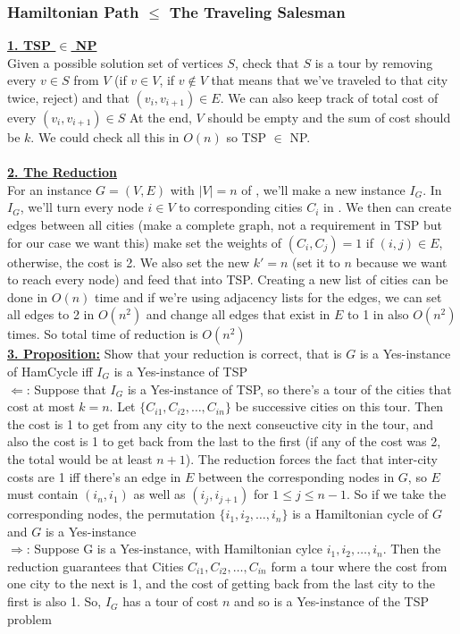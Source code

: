\subsubsection*{Hamiltonian Path $\leq$ The Traveling Salesman}
\ul{\textbf{1. TSP $\in$ NP}}\\
Given a possible solution set of vertices $S$, check that $S$ is a tour by removing every $v \in S$ from $V$ (if $v \in V$, if $v \not \in V$ that means that we've traveled to that city twice, reject) and that $(v_i, v_{i+1}) \in E$. We can also keep track of total cost of every $(v_i, v_{i+1}) \in S$ At the end, $V$ should be empty and the sum of cost should be $k$. We could check \medskip all this in $O(n)$ so TSP $\in$ NP. \\
\\
\ul{\textbf{2. The Reduction}}\\
For an instance $G = (V, E)$ with $|V| = n$ of , we'll make a new instance $I_G$. In $I_G$, we'll turn every node $i \in V$ to corresponding cities $C_i$ in . We then can create edges between all cities (make a complete graph, not a requirement in TSP but for our case we want this) make set the weights of $(C_i, C_j) = 1$ if $(i, j) \in E$, otherwise, the cost is 2. We also set the new $k' = n$ (set it to $n$ because we want to reach every node) and feed that into TSP. Creating a new list of cities can be done in $O(n)$ time and if we're using adjacency lists for the edges, we can set all edges to 2 in $O(n^2)$ and change all edges that exist in $E$ to 1 in also $O(n^2)$ times. So total time of \medskip reduction is $O(n^2)$ \\
\ul{\textbf{3. Proposition:}} Show that your reduction is correct, that is $G$ is a Yes-instance of HamCycle iff $I_G$ is a Yes-instance of TSP\\
\ul{$\Longleftarrow$}: Suppose that $I_G$ is a Yes-instance of TSP, so there's a tour of the cities that cost at most $k = n$. Let $\{C_{i1}, C_{i2}, \ldots, C_{in}\}$ be successive cities on this tour. Then the cost is 1 to get from any city to the next conseuctive city in the tour, and also the cost is 1 to get back from the last to the first (if any of the cost was 2, the total would be at least $n+1$). The reduction forces the fact that inter-city costs are 1 iff there's an edge in $E$ between the corresponding nodes in $G$, so $E$ must contain $(i_n, i_1)$ as well as $(i_j, i_{j+1})$ for $1 \leq j \leq n-1$. So if we take the corresponding nodes, the permutation $\{i_1, i_2, \ldots, i_n\}$ is a Hamiltonian cycle of $G$ and $G$ is a Yes-instance \\
\ul{$\Longrightarrow$}: Suppose G is a Yes-instance, with Hamiltonian cylce $i_1, i_2, \ldots, i_n$. Then the reduction guarantees that Cities $C_{i1}, C_{i2}, \ldots, C_{in}$ form a tour where the cost from one city to the next is 1, and the cost of getting back from the last city to the first is also 1. So, $I_G$ has a tour of cost $n$ and so is a Yes-instance of the TSP problem 


